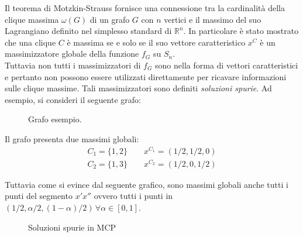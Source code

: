 Il teorema di Motzkin-Strauss fornisce una connessione tra la cardinalità della clique massima $\omega(G)$ di un grafo $G$ con $n$ vertici e il massimo del suo Lagrangiano definito nel simplesso standard di $\mathbb{R}^n$. In particolare è stato mostrato che una clique $C$ è massima se e solo se il suo vettore caratteristico $x^C$ è un massimizzatore globale della funzione $f_G$ su $S_n$.\\

Tuttavia non tutti i massimizzatori di $f_G$ sono nella forma di vettori caratteristici e pertanto non possono essere utilizzati direttamente per ricavare informazioni sulle clique massime. Tali massimizzatori sono definiti \emph{soluzioni spurie}. Ad esempio, si consideri il seguente grafo:

\begin{figure}[h!]
    \centering
    \caption{Grafo esempio.}
\end{figure}
 Il grafo presenta due massimi globali:
 \begin{align*}
     C_1 = \{1,2\} \qquad  x^{C_1} = (1 / 2, 1 / 2, 0) \\
     C_2 = \{1,3 \} \qquad x^{C_2} = (1 / 2, 0, 1 / 2)
 \end{align*}

Tuttavia come si evince dal seguente grafico, sono massimi globali anche tutti i punti del segmento $x'x''$ ovvero tutti i punti in $(1/2, \alpha / 2, (1 - \alpha) / 2) \, \forall \alpha \in [0,1]$.
\begin{figure}[h!]
    \centering
    \caption{Soluzioni spurie in MCP}
\end{figure}

